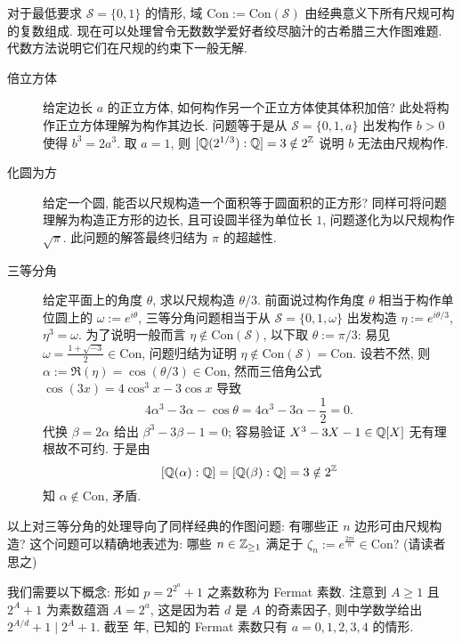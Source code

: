 对于最低要求 $\mathcal{S} = \{0,1\}$ 的情形, 域 $\text{Con} := \text{Con}(\mathcal{S})$ 由经典意义下所有尺规可构的复数组成. 现在可以处理曾令无数数学爱好者绞尽脑汁的古希腊三大作图难题. 代数方法说明它们在尺规的约束下一般无解.
\begin{description}
	\item[倍立方体] 给定边长 $a$ 的正立方体, 如何构作另一个正立方体使其体积加倍? 此处将构作正立方体理解为构作其边长. 问题等于是从 $\mathcal{S} = \{0, 1, a\}$ 出发构作 $b > 0$ 使得 $b^3 = 2a^3$. 取 $a=1$, 则 $[\mathbb{Q}(2^{1/3}):\mathbb{Q}] = 3 \notin 2^{\mathbb{Z}}$ 说明 $b$ 无法由尺规构作.
	
	\item[化圆为方] 给定一个圆, 能否以尺规构造一个面积等于圆面积的正方形? 同样可将问题理解为构造正方形的边长, 且可设圆半径为单位长 $1$, 问题遂化为以尺规构作 $\sqrt{\pi}$. 此问题的解答最终归结为 $\pi$ 的超越性.

	\item[三等分角] 给定平面上的角度 $\theta$, 求以尺规构造 $\theta/3$. 前面说过构作角度 $\theta$ 相当于构作单位圆上的 $\omega := e^{i\theta}$, 三等分角问题相当于从 $\mathcal{S} = \{0,1,\omega\}$ 出发构造 $\eta := e^{i\theta/3}$, $\eta^3 = \omega$. 为了说明一般而言 $\eta \notin \text{Con}(\mathcal{S})$, 以下取 $\theta := \pi/3$: 易见 $\omega = \frac{1 + \sqrt{-3}}{2} \in \text{Con}$, 问题归结为证明 $\eta \notin \text{Con}(\mathcal{S}) = \text{Con}$. 设若不然, 则 $\alpha := \Re(\eta) = \cos(\theta/3) \in \text{Con}$, 然而三倍角公式 $\cos(3x) = 4 \cos^3 x - 3\cos x$ 导致
	\[ 4\alpha^3 - 3\alpha - \cos\theta = 4\alpha^3 - 3\alpha - \frac{1}{2} = 0. \]
	代换 $\beta = 2\alpha$ 给出 $\beta^3 - 3\beta - 1 = 0$; 容易验证 $X^3 - 3X - 1 \in \mathbb{Q}[X]$ 无有理根故不可约. 于是由
	\[ [\mathbb{Q}(\alpha):\mathbb{Q}] = [\mathbb{Q}(\beta) : \mathbb{Q}] = 3 \notin 2^{\mathbb{Z}} \]
	知 $\alpha \notin \text{Con}$, 矛盾.
\end{description}

以上对三等分角的处理导向了同样经典的作图问题: 有哪些正 $n$ 边形可由尺规构造? 这个问题可以精确地表述为: 哪些 $n \in \mathbb{Z}_{\geq 1}$ 满足于 $\zeta_n := e^{\frac{2\pi i}{n}} \in \text{Con}$? (请读者思之)

我们需要以下概念: 形如 $p = 2^{2^a} + 1$ 之素数称为 Fermat 素数. 注意到 $A \geq 1$ 且 $2^A + 1$ 为素数蕴涵 $A = 2^a$, 这是因为若 $d$ 是 $A$ 的奇素因子, 则中学数学给出 $2^{A/d} + 1 \mid 2^A + 1$. 截至 \the\year 年, 已知的 Fermat 素数只有 $a=0,1,2,3,4$ 的情形.

